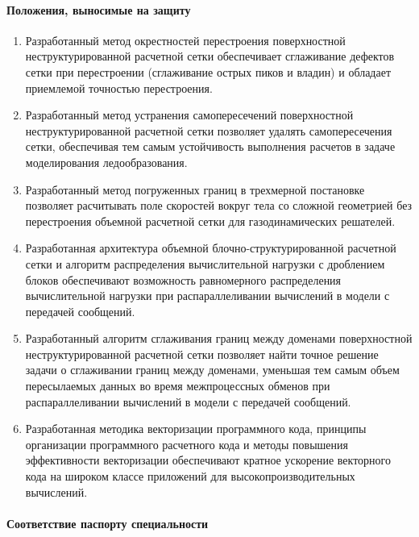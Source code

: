 \documentclass[a4paper,14pt]{extarticle}                     %
\theoremstyle{plain}                                         %
\begin{document}
\paragraph{Положения, выносимые на защиту}
\begin{enumerate}[noitemsep,topsep=0pt,parsep=0pt,partopsep=0pt]
\item Разработанный метод окрестностей перестроения поверхностной неструктурированной расчетной сетки обеспечивает сглаживание дефектов сетки при перестроении (сглаживание острых пиков и владин) и обладает приемлемой точностью перестроения.
\item Разработанный метод устранения самопересечений поверхностной неструктурированной расчетной сетки позволяет удалять самопересечения сетки, обеспечивая тем самым устойчивость выполнения расчетов в задаче моделирования ледообразования.
\item Разработанный метод погруженных границ в трехмерной постановке позволяет расчитывать поле скоростей вокруг тела со сложной геометрией без перестроения объемной расчетной сетки для газодинамических решателей.
\item Разработанная архитектура объемной блочно-структурированной расчетной сетки и алгоритм распределения вычислительной нагрузки с дроблением блоков обеспечивают возможность равномерного распределения вычислительной нагрузки при распараллеливании вычислений в модели с передачей сообщений.
\item Разработанный алгоритм сглаживания границ между доменами поверхностной неструктурированной расчетной сетки позволяет найти точное решение задачи о сглаживании границ между доменами, уменьшая тем самым объем пересылаемых данных во время межпроцессных обменов при распараллеливании вычислений в модели с передачей сообщений.
\item Разработанная методика векторизации программного кода, принципы организации программного расчетного кода и методы повышения эффективности векторизации обеспечивают кратное ускорение векторного кода на широком классе приложений для высокопроизводительных вычислений.
\end{enumerate}

\paragraph{Соответствие паспорту специальности}

\
\end{document}
